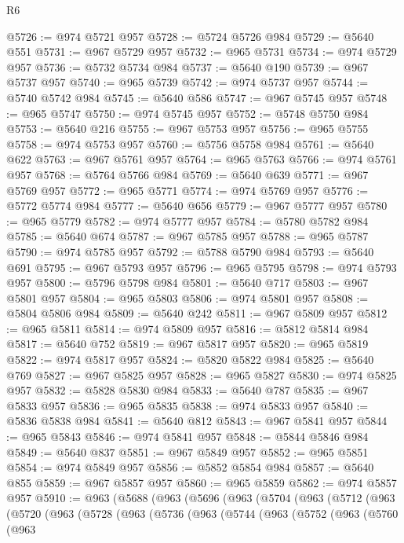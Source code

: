 \begin{lexlean}{R6}
\begin{coremodule}
@5726 := @974 @5721 @957
@5728 := @5724 @5726 @984
@5729 := @5640 @551
@5731 := @967 @5729 @957
@5732 := @965 @5731
@5734 := @974 @5729 @957
@5736 := @5732 @5734 @984
@5737 := @5640 @190
@5739 := @967 @5737 @957
@5740 := @965 @5739
@5742 := @974 @5737 @957
@5744 := @5740 @5742 @984
@5745 := @5640 @586
@5747 := @967 @5745 @957
@5748 := @965 @5747
@5750 := @974 @5745 @957
@5752 := @5748 @5750 @984
@5753 := @5640 @216
@5755 := @967 @5753 @957
@5756 := @965 @5755
@5758 := @974 @5753 @957
@5760 := @5756 @5758 @984
@5761 := @5640 @622
@5763 := @967 @5761 @957
@5764 := @965 @5763
@5766 := @974 @5761 @957
@5768 := @5764 @5766 @984
@5769 := @5640 @639
@5771 := @967 @5769 @957
@5772 := @965 @5771
@5774 := @974 @5769 @957
@5776 := @5772 @5774 @984
@5777 := @5640 @656
@5779 := @967 @5777 @957
@5780 := @965 @5779
@5782 := @974 @5777 @957
@5784 := @5780 @5782 @984
@5785 := @5640 @674
@5787 := @967 @5785 @957
@5788 := @965 @5787
@5790 := @974 @5785 @957
@5792 := @5788 @5790 @984
@5793 := @5640 @691
@5795 := @967 @5793 @957
@5796 := @965 @5795
@5798 := @974 @5793 @957
@5800 := @5796 @5798 @984
@5801 := @5640 @717
@5803 := @967 @5801 @957
@5804 := @965 @5803
@5806 := @974 @5801 @957
@5808 := @5804 @5806 @984
@5809 := @5640 @242
@5811 := @967 @5809 @957
@5812 := @965 @5811
@5814 := @974 @5809 @957
@5816 := @5812 @5814 @984
@5817 := @5640 @752
@5819 := @967 @5817 @957
@5820 := @965 @5819
@5822 := @974 @5817 @957
@5824 := @5820 @5822 @984
@5825 := @5640 @769
@5827 := @967 @5825 @957
@5828 := @965 @5827
@5830 := @974 @5825 @957
@5832 := @5828 @5830 @984
@5833 := @5640 @787
@5835 := @967 @5833 @957
@5836 := @965 @5835
@5838 := @974 @5833 @957
@5840 := @5836 @5838 @984
@5841 := @5640 @812
@5843 := @967 @5841 @957
@5844 := @965 @5843
@5846 := @974 @5841 @957
@5848 := @5844 @5846 @984
@5849 := @5640 @837
@5851 := @967 @5849 @957
@5852 := @965 @5851
@5854 := @974 @5849 @957
@5856 := @5852 @5854 @984
@5857 := @5640 @855
@5859 := @967 @5857 @957
@5860 := @965 @5859
@5862 := @974 @5857 @957
@5910 := @963
    (@5688
      (@963
        (@5696
          (@963
            (@5704
              (@963
                (@5712
                  (@963
                    (@5720
                      (@963
                        (@5728
                          (@963
                            (@5736
                              (@963
                                (@5744
                                  (@963
                                    (@5752
                                      (@963
                                        (@5760
                                          (@963

\end{coremodule}
\end{lexlean}

